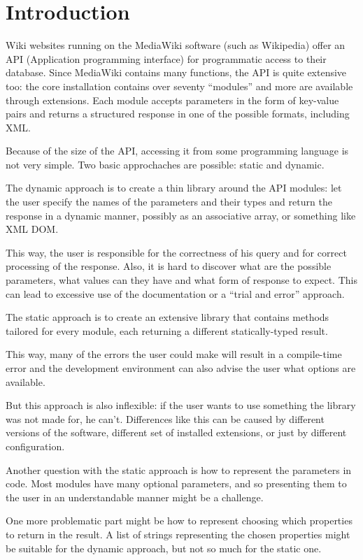 \chapter*{Introduction}

Wiki websites running on the MediaWiki software (such as Wikipedia) offer an API (Application programming interface)
for programmatic access to their database.
Since MediaWiki contains many functions, the API is quite extensive too: the core installation contains over seventy “modules”
and more are available through extensions. Each module accepts parameters in the form of key-value pairs
and returns a structured response in one of the possible formats, including XML.

Because of the size of the API, accessing it from some programming language is not very simple.
Two basic approchaches are possible: static and dynamic.

The dynamic approach is to create a thin library around the API modules:
let the user specify the names of the parameters and their types and return the response
in a dynamic manner, possibly as an associative array, or something like XML DOM.

This way, the user is responsible for the correctness of his query and for correct processing
of the response.
Also, it is hard to discover what are the possible parameters, what values can they have
and what form of response to expect.
This can lead to excessive use of the documentation or a ``trial and error'' approach.

The static approach is to create an extensive library that contains methods tailored for every module,
each returning a different statically-typed result.

This way, many of the errors the user could make will result in a compile-time error
and the development environment can also advise the user what options are available.

But this approach is also inflexible: if the user wants to use something the library
was not made for, he can't.
Differences like this can be caused by different versions of the software,
different set of installed extensions, or just by different configuration.

Another question with the static approach is how to represent the parameters in code.
Most modules have many optional parameters, and so presenting them to the user
in an understandable manner might be a challenge.

One more problematic part might be how to represent choosing which properties to return in the result.
A list of strings representing the chosen properties might be suitable for the dynamic approach, but not so much for the static one.

